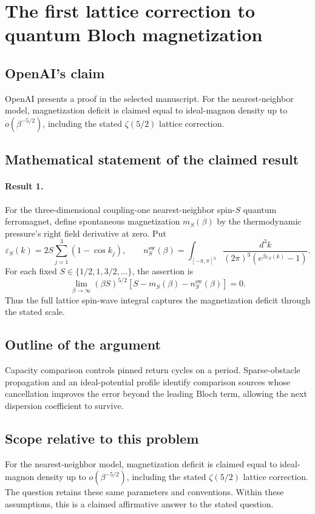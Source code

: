 \documentclass[11pt]{article}
\begin{document}
\section*{The first lattice correction to quantum Bloch magnetization}

\subsection{OpenAI's claim}
OpenAI presents a proof in the selected manuscript. For the nearest-neighbor model, magnetization deficit is claimed equal to ideal-magnon density up to $o(\beta^{-5/2})$, including the stated $\zeta(5/2)$ lattice correction.

\subsection{Mathematical statement of the claimed result}
\paragraph{Result 1.} For the three-dimensional coupling-one nearest-neighbor spin-\(S\) quantum ferromagnet, define spontaneous magnetization \(m_S(\beta)\) by the thermodynamic pressure's right field derivative at zero. Put
\[
 \varepsilon_S(k)=2S\sum_{j=1}^3(1-\cos k_j),\qquad
 n_S^{\mathrm{sw}}(\beta)=\int_{[-\pi,\pi]^3}
 \frac{d^3k}{(2\pi)^3(e^{\beta\varepsilon_S(k)}-1)}.
\]
For each fixed $S\in\{1/2,1,3/2,\ldots\}$, the assertion is
\[
 \lim_{\beta\to\infty}(\beta S)^{5/2}
 [S-m_S(\beta)-n_S^{\mathrm{sw}}(\beta)]=0.
\]
Thus the full lattice spin-wave integral captures the magnetization deficit through the stated scale.

\subsection{Outline of the argument}
Capacity comparison controls pinned return cycles on a period. Sparse-obstacle propagation and an ideal-potential profile identify comparison sources whose cancellation improves the error beyond the leading Bloch term, allowing the next dispersion coefficient to survive.

\subsection{Scope relative to this problem}
For the nearest-neighbor model, magnetization deficit is claimed equal to ideal-magnon density up to $o(\beta^{-5/2})$, including the stated $\zeta(5/2)$ lattice correction. The question retains these same parameters and conventions. Within these assumptions, this is a claimed affirmative answer to the stated question.
\end{document}
